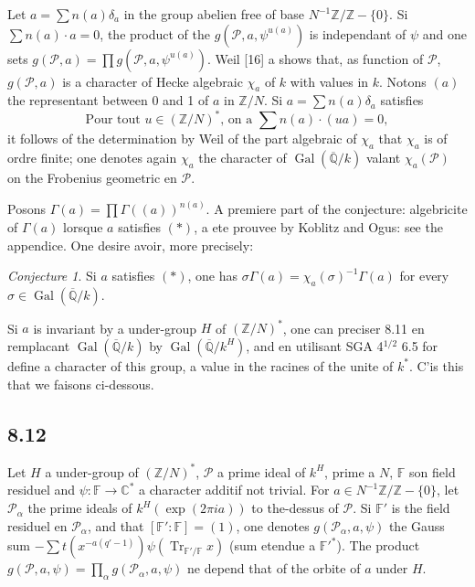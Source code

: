 \documentclass[12pt,a4paper]{article}
\theoremstyle{plain}
\theoremstyle{definition}
\theoremstyle{remark}
\newtheorem{conjecture}[definition]{Conjecture}
\DeclareMathOperator{\Gal}{Gal}
\DeclareMathOperator{\Tr}{Tr}
\newcommand{\Q}{\mathbb{Q}}
\newcommand{\C}{\mathbb{C}}
\newcommand{\Z}{\mathbb{Z}}
\begin{document}
Let $a = \sum n(a) \delta_a$ in the group abelien free of base $N^{-1}\Z/\Z - \{0\}$. Si
$\sum n(a) \cdot a = 0$, the product of the $g(\mathcal{P}, a, \psi^{u(a)})$ is independant of $\psi$ and one sets
$g(\mathcal{P}, a) = \prod g(\mathcal{P}, a, \psi^{u(a)})$. Weil [16] a shows that, as function of $\mathcal{P}$,
$g(\mathcal{P}, a)$ is a character of Hecke algebraic $\chi_a$ of $k$ with values in $k$. Notons
$(a)$ the representant between 0 and 1 of $a$ in $\Z/N$. Si $a = \sum n(a) \delta_a$ satisfies
\begin{equation}\label{eq:star}
\text{Pour tout } u \in (\Z/N)^*\text{, on a } \sum n(a) \cdot (ua) = 0,\tag{$*$}
\end{equation}
it follows of the determination by Weil of the part algebraic of $\chi_a$ that
$\chi_a$ is of ordre finite; one denotes again $\chi_a$ the character of $\Gal(\overline{\Q}/k)$ valant
$\chi_a(\mathcal{P})$ on the Frobenius geometric en $\mathcal{P}$.

Posons $\Gamma(a) = \prod \Gamma((a))^{n(a)}$. A premiere part of the conjecture:
algebricite of $\Gamma(a)$ lorsque $a$ satisfies $(*)$, a ete prouvee by Koblitz and Ogus:
see the appendice. One desire avoir, more precisely:

\begin{conjecture}\label{conj:8.11}
Si $a$ satisfies $(*)$, one has $\sigma \Gamma(a) = \chi_a(\sigma)^{-1} \Gamma(a)$ for every
$\sigma \in \Gal(\overline{\Q}/k)$.
\end{conjecture}

Si $a$ is invariant by a under-group $H$ of $(\Z/N)^*$, one can preciser 8.11 en
remplacant $\Gal(\overline{\Q}/k)$ by $\Gal(\overline{\Q}/k^H)$, and en utilisant SGA 4$^{1/2}$ 6.5 for define a
character of this group, a value in the racines of the unite of $k^*$. C'is this that we
faisons ci-dessous.

\subsection*{8.12}

Let $H$ a under-group of $(\Z/N)^*$, $\mathcal{P}$ a prime ideal of $k^H$, prime a $N$,
$\mathbb{F}$ son field residuel and $\psi: \mathbb{F} \to \C^*$ a character additif not trivial. For
$a \in N^{-1}\Z/\Z - \{0\}$, let $\mathcal{P}_\alpha$ the prime ideals of $k^H(\exp(2\pi i a))$
to the-dessus of $\mathcal{P}$. Si $\mathbb{F}'$ is the field residuel en $\mathcal{P}_\alpha$, and that $[\mathbb{F}':\mathbb{F}] = (1)$, one denotes $g(\mathcal{P}_\alpha, a, \psi)$ the Gauss sum $-\sum t(x^{-a(q'-1)}) \psi(\Tr_{\mathbb{F}'/\mathbb{F}} x)$
(sum etendue a $\mathbb{F}'^*$). The product $g(\mathcal{P}, a, \psi) = \prod_\alpha g(\mathcal{P}_\alpha, a, \psi)$ ne
depend that of the orbite of $a$ under $H$.
\end{document}
